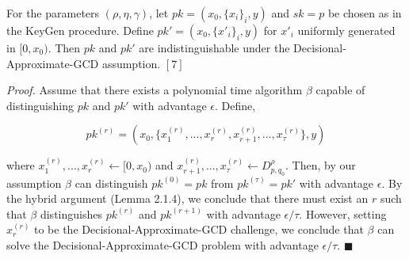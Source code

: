 \documentclass[../../main.tex]{subfiles}
\begin{document}
\begin{lemma}
For the parameters $(\rho, \eta, \gamma)$, let $pk = (x_0, \{x_i\}_i, y)$ and $sk=p$ be chosen as in the KeyGen procedure. Define $pk'=(x_0,\{x'_{i}\}_i,y)$ for $x'_{i}$ uniformly generated in $[0,x_0)$. Then $pk$ and $pk'$ are indistinguishable under the Decisional-Approximate-GCD assumption. $[7]$
\end{lemma}

\noindent\textit{Proof.} Assume that there exists a polynomial time algorithm $\beta$ capable of distinguishing $pk$ and $pk'$ with advantage $\epsilon$. Define,

\begin{equation*}
    pk^{(r)} = (x_0, \{x_1^{(r)}, ... , x_r^{(r)}, x_{r+1}^{(r)}, ... , x_\tau^{(r)}\}, y)
\end{equation*}

\noindent where $x_1^{(r)}, ... , x_r^{(r)} \leftarrow [0, x_0)$ and $x_{r+1}^{(r)}, ... , x_\tau^{(r)} \leftarrow D^\rho_{p,q_0}$. Then, by our assumption $\beta$ can distinguish $pk^{(0)} = pk$ from $pk^{(\tau)} = pk'$ with advantage $\epsilon$. By the hybrid argument (Lemma 2.1.4), we conclude that there must exist an $r$ such that $\beta$ distinguishes $pk^{(r)}$ and $pk^{(r+1)}$ with advantage $\epsilon / \tau$. However, setting $x_r^{(r)}$ to be the Decisional-Approximate-GCD challenge, we conclude that $\beta$ can solve the Decisional-Approximate-GCD problem with advantage $\epsilon / \tau$. $\blacksquare$ 
\end{document}
